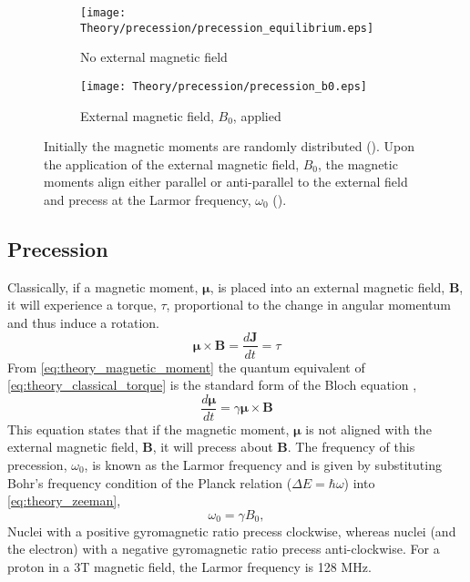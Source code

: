 \begin{figure}[H]
	\centering
	\begin{subfigure}[c]{0.47\textwidth}
		\centering
		\texttt{[image: Theory/precession/precession\_equilibrium.eps]}
		\caption{No external magnetic field}
		\label{fig:theory_precession_eq}
	\end{subfigure}
	\hfill
	\begin{subfigure}[c]{0.47\textwidth}
		\centering
		\texttt{[image: Theory/precession/precession\_b0.eps]}
		\caption{External magnetic field, $B_0$, applied}
		\label{fig:theory_precession_b0}
	\end{subfigure}
	\caption{Initially the magnetic moments are randomly distributed (). Upon the application of the external magnetic field, $B_0$, the magnetic moments align either parallel or anti-parallel to the external field and precess at the Larmor frequency, $\omega_0$ ().}
	\label{fig:theory_precession}
\end{figure}

\subsection{Precession}

Classically, if a magnetic moment, $\bm{\mu}$, is placed into an external magnetic field, $\mathbf{B}$, it will experience a torque, $\tau$, proportional to the change in angular momentum and thus induce a rotation.
\begin{equation}
\bm{\mu} \times \mathbf{B} = \frac{d\mathbf{J}}{dt} = \tau
\label{eq:theory_classical_torque}
\end{equation}
From \eqref{eq:theory_magnetic_moment} the quantum equivalent of \eqref{eq:theory_classical_torque} is the standard form of the Bloch equation \cite{bloch_nuclear_1946},
\begin{equation}
\frac{d\bm{\mu}}{dt} = \gamma \bm{\mu} \times \mathbf{B}
\label{eq:theory_bloch_standard}
\end{equation}
This equation states that if the magnetic moment, $\bm{\mu}$ is not aligned with the external magnetic field, $\mathbf{B}$, it will precess about $\mathbf{B}$. The frequency of this precession, $\omega_0$, is known as the Larmor frequency and is given by substituting Bohr's frequency condition of the Planck relation ($\Delta E = \hbar \omega $) into \eqref{eq:theory_zeeman},
\begin{equation}
\omega_0=\gamma B_0,
\label{eq:theory_larmor}
\end{equation}
Nuclei with a positive gyromagnetic ratio precess clockwise, whereas nuclei (and the electron) with a negative gyromagnetic ratio precess anti-clockwise. For a proton in a 3T magnetic field, the Larmor frequency is 128 MHz.

